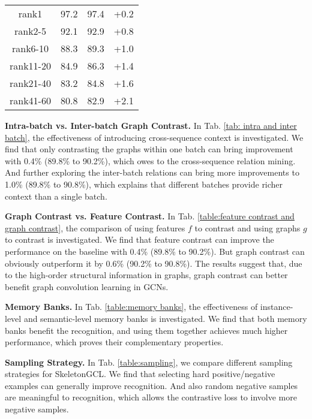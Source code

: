 \documentclass{article} \usepackage{iclr2023_conference,times}
\begin{document}
\begin{minipage}{\textwidth}
\begin{minipage}[t]{0.5\textwidth}
\begin{tabular}{c||c||c||c}
       \hline \hline
        rank1 &	97.2 & 97.4 & +0.2 \\
        rank2-5 & 92.1 & 92.9 & +0.8 \\
        rank6-10 & 88.3 & 89.3 & +1.0 \\
        rank11-20 & 84.9 & 86.3 & +1.4 \\
        rank21-40 & 83.2 & 84.8 & +1.6 \\
        rank41-60 & 80.8 & 82.9 & +2.1 \\
        \hline
    \end{tabular}
    \label{table:rank}
\end{minipage}
\end{minipage}

\noindent \textbf{Intra-batch vs. Inter-batch Graph Contrast.} 
In Tab. \ref{tab: intra and inter batch}, the effectiveness of introducing cross-sequence context is investigated. We find that only contrasting the graphs within one batch can bring improvement with 0.4\% (89.8\% to 90.2\%), which owes to the cross-sequence relation mining. And further exploring the inter-batch relations can bring more improvements to 1.0\% (89.8\% to 90.8\%), which explains that different batches provide richer context than a single batch.

\noindent \textbf{Graph Contrast vs. Feature Contrast.}
In Tab. \ref{table:feature contrast and graph contrast}, the comparison of using features $f$ to contrast and using graphs $g$ to contrast is investigated. We find that feature contrast can improve the performance on the baseline with 0.4\% (89.8\% to 90.2\%). But graph contrast can obviously outperform it by 0.6\% (90.2\% to 90.8\%). The results suggest that, due to the high-order structural information in graphs, graph contrast can better benefit graph convolution learning in GCNs.

\noindent \textbf{Memory Banks.} In Tab. \ref{table:memory banks}, the effectiveness of instance-level and semantic-level memory banks is investigated. We find that both memory banks benefit the recognition, and using them together achieves much higher performance, which proves their complementary properties.

\noindent \textbf{Sampling Strategy.} 
In Tab. \ref{table:sampling}, we compare different sampling strategies for SkeletonGCL. We find that selecting hard positive/negative examples can generally improve recognition. And also random negative samples are meaningful to recognition, which allows the contrastive loss to involve more negative samples.
\end{document}
